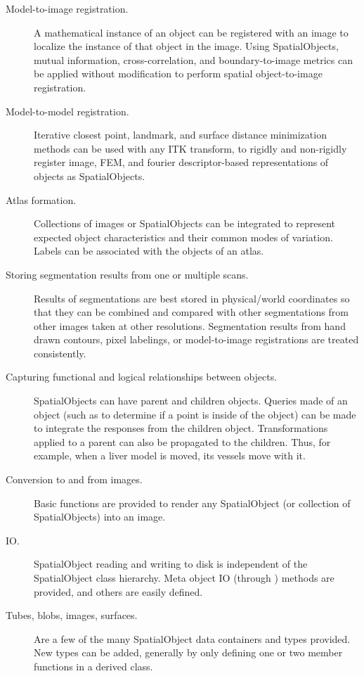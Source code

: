 \begin{description}
  \item[Model-to-image registration.] A mathematical instance of an object
  can be registered with an image to localize the instance of that object in
  the image.  Using SpatialObjects, mutual information, cross-correlation, and
  boundary-to-image metrics can be applied without modification to
  perform spatial object-to-image registration.

  \item[Model-to-model registration.] Iterative closest point, landmark, and
  surface distance minimization methods can be used with any ITK transform,
  to rigidly and non-rigidly register image, FEM, and fourier
  descriptor-based representations of objects as SpatialObjects.

  \item[Atlas formation.] Collections of images or SpatialObjects can be
  integrated to represent expected object characteristics and their common
  modes of variation.  Labels can be associated with the objects of an atlas.

  \item[Storing segmentation results from one or multiple scans.] Results of
  segmentations are best stored in physical/world coordinates so that they
  can be combined and compared with other segmentations from other images
  taken at other resolutions.  Segmentation results from hand drawn contours,
  pixel labelings, or model-to-image registrations are treated consistently.

  \item[Capturing functional and logical relationships between objects.]
  SpatialObjects can have parent and children objects.  Queries made of an
  object (such as to determine if a point is inside of the object) can be
  made to integrate the responses from the children object.  Transformations
  applied to a parent can also be propagated to the children.  Thus, for
  example, when a liver model is moved, its vessels move with it.

  \item[Conversion to and from images.] Basic functions are provided to
  render any SpatialObject (or collection of SpatialObjects) into an image.

  \item[IO.] SpatialObject reading and writing to disk is independent of the
  SpatialObject class hierarchy.  Meta object IO (through
  ) methods are provided, and others are easily defined.

  \item[Tubes, blobs, images, surfaces.] Are a few of the many SpatialObject
  data containers and types provided.  New types can be added, generally by
  only defining one or two member functions in a derived class.
\end{description}

